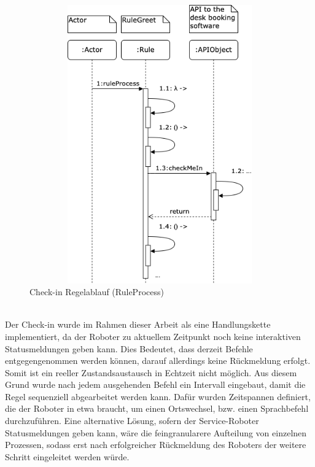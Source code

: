         \begin{figure}[hbt!]
            \centering
            \includegraphics[width=14cm,height=12cm,keepaspectratio]{images/sequence_rule_temi_greet.png}
            \caption{Check-in Regelablauf (RuleProcess)}
            \label{fig:sequenceRuleGreet}
        \end{figure}
        \\
        Der Check-in wurde im Rahmen dieser Arbeit als eine Handlungskette implementiert, da der Roboter zu aktuellem Zeitpunkt noch keine interaktiven Statusmeldungen geben kann. Dies 
        Bedeutet, dass derzeit Befehle entgegengenommen werden können, darauf allerdings keine Rückmeldung erfolgt. Somit ist ein reeller Zustandsaustausch in Echtzeit nicht möglich. 
        Aus diesem Grund wurde nach jedem ausgehenden Befehl ein Intervall eingebaut, damit die Regel sequenziell abgearbeitet werden kann. Dafür wurden Zeitspannen definiert, die 
        der Roboter in etwa braucht, um einen Ortswechsel, bzw. einen Sprachbefehl durchzuführen. Eine alternative Lösung, sofern der Service-Roboter Statusmeldungen geben 
        kann, wäre die feingranularere Aufteilung von einzelnen Prozessen, sodass erst nach erfolgreicher Rückmeldung des Roboters der weitere Schritt eingeleitet werden würde.
        \\
        \linebreak
